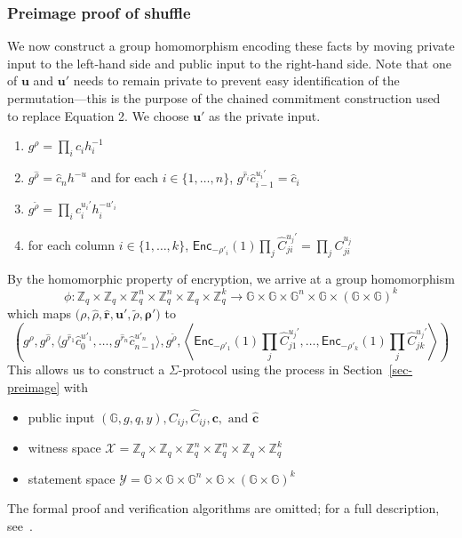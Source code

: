 \documentclass[12pt,a4paper]{article}
\theoremstyle{definition}
\begin{document}
\subsubsection{Preimage proof of shuffle}
We now construct a group homomorphism encoding these facts by moving private input to the left-hand side and public input to the right-hand side. Note that one of $\mathbf{u}$ and $\mathbf{u'}$ needs to remain private to prevent easy identification of the permutation---this is the purpose of the chained commitment construction used to replace Equation 2. We choose $\mathbf{u'}$ as the private input.
\begin{enumerate}
    \item $g^\rho=\prod_i c_i h_i^{-1}$
    \item $g^{\hat{\rho}}=\hat{c}_nh^{-u}$ and for each $i\in\{1,\ldots, n\}$, $g^{\hat{r}_i}\hat{c}_{i-1}^{u_i'}=\hat{c}_i$
    \item $g^{\tilde{\rho}} = \prod_i c_i^{u_i'}h_i^{-u'_i}$
    \item for each column $i\in\{1,\ldots, k\}$, $\mathsf{Enc}_{-\rho'_i}(1)\prod_j \hat{C}_{ji}^{u_j'}=\prod_j C^{u_j}_{ji}$
\end{enumerate}
By the homomorphic property of encryption, we arrive at a group homomorphism $$\phi:\mathbb{Z}_q\times\mathbb{Z}_q\times\mathbb{Z}_q^n\times\mathbb{Z}_q^n\times\mathbb{Z}_q\times\mathbb{Z}_q^k\rightarrow \mathbb{G}\times\mathbb{G}\times\mathbb{G}^n\times\mathbb{G}\times(\mathbb{G}\times\mathbb{G})^k$$
which maps $\big(\rho, \hat{\rho}, \mathbf{\hat{r}},\mathbf{u}', \tilde{\rho}, \mathbf{\rho}'\big)$ to
$$\left(g^\rho, g^{\hat{\rho}}, \langle g^{\hat{r}_1}\hat{c}_0^{u'_1},\ldots,g^{\hat{r}_n}\hat{c}_{n-1}^{u'_n}\rangle, g^{\tilde{\rho}},\left\langle
    \mathsf{Enc}_{-\rho'_1}(1)\prod_j \hat{C}_{j1}^{u_j'},
    \ldots,
    \mathsf{Enc}_{-\rho'_k}(1)\prod_j \hat{C}_{jk}^{u_j'}\right\rangle\right)$$
This allows us to construct a $\Sigma$-protocol using the process in Section~\ref{sec-preimage} with
\begin{itemize}
    \item public input $(\mathbb{G}, g, q, y), C_{ij}, \hat{C}_{ij}, \mathbf{c},\text{ and }\mathbf{\hat{c}}$
    \item witness space $\mathcal{X}=\mathbb{Z}_q\times\mathbb{Z}_q\times\mathbb{Z}_q^n\times\mathbb{Z}_q^n\times\mathbb{Z}_q\times\mathbb{Z}_q^k$
    \item statement space $\mathcal{Y} = \mathbb{G}\times\mathbb{G}\times\mathbb{G}^n\times\mathbb{G}\times(\mathbb{G}\times\mathbb{G})^k$
\end{itemize}
The formal proof and verification algorithms are omitted; for a full description, see~\cite{haenni2017pseudo}.
\end{document}

